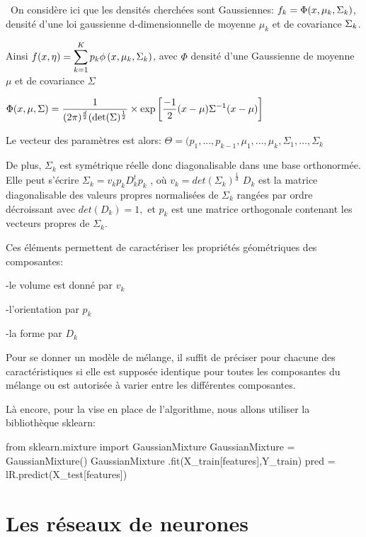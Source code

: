\documentclass[a4paper,oneside,11pt]{article}
\newcommand{\ds}{\ensuremath{\displaystyle}}
\begin{document}
\ On considère ici que les densités cherchées sont Gaussiennes:
$\ds{f_{k}=\Phi(x,\mu_{k},\Sigma_{k})}$, densité d'une loi gaussienne d-dimensionnelle de moyenne $\mu_{k}$ \newline
et de covariance $\ds{\Sigma_{k}}$.

Ainsi $\ds{f(x,\eta)=\sum_{k=1}^{K}p_{k}\phi\left(x,\mu_{k},\Sigma_{k}\right)}$, avec $\Phi$ densité d'une Gaussienne de moyenne $\mu$ et de covariance $\Sigma$

$\ds{\Phi(x,\mu,\Sigma)=\frac{1}{(2\pi)^{\frac{d}{2}}(\det(\Sigma)^{\frac{1}{2}}} \times \exp\left[\frac{-1}{2}(x-\mu)\Sigma^{-1}(x-\mu)\right]}$

Le vecteur des paramètres est alors:
$\Theta=(p_1,...,p_{k-1},\mu_1,...,\mu_{k},\Sigma_{1},...,\Sigma_{k}$

De plus, $\Sigma_{k}$ est symétrique réelle donc diagonalisable dans une base orthonormée. Elle peut s'écrire $\Sigma_{k}=v_{k}p_{k}D_{k}^{t}p_{k}$ , où $v_{k}=det(\Sigma_{k})^{\frac{1}{d}}$
$D_k$ est la matrice diagonalisable des valeurs propres normalisées de $\Sigma_{k}$ rangées par ordre décroissant avec $det(D_k)=1,$ et $p_k$ est une matrice orthogonale contenant les vecteurs propres de $\Sigma_k$.

Ces éléments permettent de caractériser les propriétés géométriques des composantes:

-le volume est donné par $v_k$

-l'orientation par $p_k$

-la forme par $D_k$ 

Pour se donner un modèle de mélange, il suffit de préciser pour chacune des caractéristiques si elle est supposée identique pour toutes les composantes du mélange ou est autorisée à varier entre les différentes composantes.


Là encore, pour la vise en place de l'algorithme, nous allons utiliser la bibliothèque sklearn:


\begin{code-Python}
from sklearn.mixture import GaussianMixture
GaussianMixture = GaussianMixture()
GaussianMixture .fit(X_train[features],Y_train)
pred = lR.predict(X_test[features])
\end{code-Python}
\newpage
\section*{Les réseaux de neurones}
%
\end{document}

